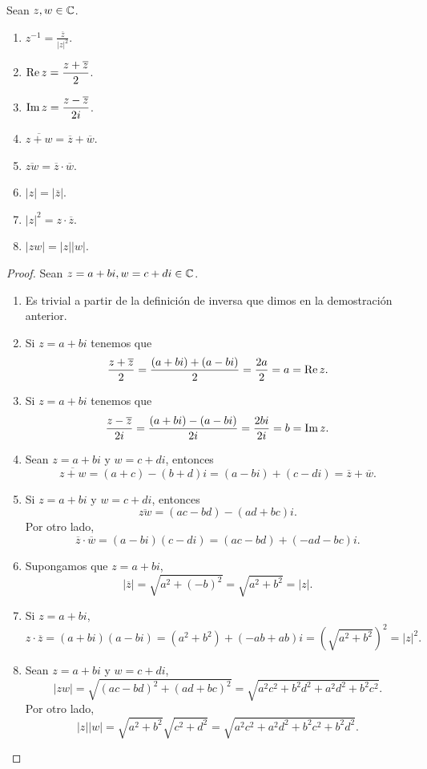 \begin{prop}
	Sean $\displaystyle z,w \in \mathbb{C} $.
\begin{enumerate}
\item $\displaystyle z^{-1}=\frac{\overline{z}}{ \left|z\right|^{2}} $.
\item $\displaystyle \operatorname{Re} z =\frac{z + \overline{z}}{2} $. 
\item $\displaystyle \operatorname{Im} z=\frac{z-\overline{z}}{2i} $. 
\item $\displaystyle \overline{z + w}= \overline{z} + \overline{w} $.
\item $\displaystyle \overline{zw} = \overline{z} \cdot \overline{w} $.
\item $\displaystyle \left|z\right|= \left|\overline{z}\right| $.
\item $\displaystyle \left|z\right|^{2} = z \cdot \overline{z} $.
\item $\displaystyle \left|zw\right| = \left|z\right| \left|w\right| $.
\end{enumerate}
\end{prop}
\begin{proof}
Sean $\displaystyle z = a +bi, w = c + di \in \mathbb{C} $. 
\begin{enumerate}
\item Es trivial a partir de la definición de inversa que dimos en la demostración anterior.
\item Si $\displaystyle z = a + bi $ tenemos que 
	\[\frac{z + \overline{z}}{2}=\frac{\left(a + bi\right)+\left(a-bi\right)}{2}=\frac{2a}{2}=a = \operatorname{Re} z .\]
\item Si $\displaystyle z = a + bi $ tenemos que 
	\[\frac{z -\overline{z}}{2i}=\frac{\left(a+bi\right)-\left(a-bi\right)}{2i}=\frac{2bi}{2i}=b=\operatorname{Im} z .\]
\item Sean $\displaystyle z = a + bi $ y $\displaystyle w = c + di $, entonces
	\[\overline{z + w}= \left(a + c\right)-\left(b + d\right)i = \left(a - bi\right)+\left(c-di\right) = \overline{z} + \overline{w} .\]
\item Si $\displaystyle z = a + bi $ y $\displaystyle w = c + di $, entonces
	\[\overline{zw}=\left(ac - bd\right)-\left(ad + bc\right)i .\]
	Por otro lado, 
	\[\overline{z} \cdot \overline{w}= \left(a -bi\right)\left(c -di\right)=\left(ac-bd\right)+\left(-ad-bc\right)i .\]
\item Supongamos que $\displaystyle z = a + bi $, 
	\[ \left|\overline{z}\right|=\sqrt{a^{2}+\left(-b\right)^{2}}=\sqrt{a^{2}+b^{2}}= \left|z\right| .\]
\item Si $\displaystyle z = a + bi $,
	\[ z \cdot \overline{z}=\left(a + bi\right)\left(a - bi\right)=\left(a^{2}+b^{2}\right)+\left(-ab + ab\right)i = \left(\sqrt{a^{2}+b^{2}}\right)^{2}= \left|z\right|^{2} .\]
\item Sean $\displaystyle z = a + bi $ y $\displaystyle w = c + di $,
	\[ \left|zw\right|=\sqrt{\left(ac - bd\right)^{2}+\left(ad + bc\right)^{2}} = \sqrt{a^{2}c^{2} + b^{2}d^{2}+a^{2}d^{2}+b^{2}c^{2}}.\]
Por otro lado, 
\[ \left|z\right| \left|w\right|=\sqrt{a^{2}+b^{2}}\sqrt{c^{2}+d^{2}}=\sqrt{a^{2}c^{2}+a^{2}d^{2}+b^{2}c^{2}+b^{2}d^{2}} .\]
\end{enumerate}
\end{proof}
